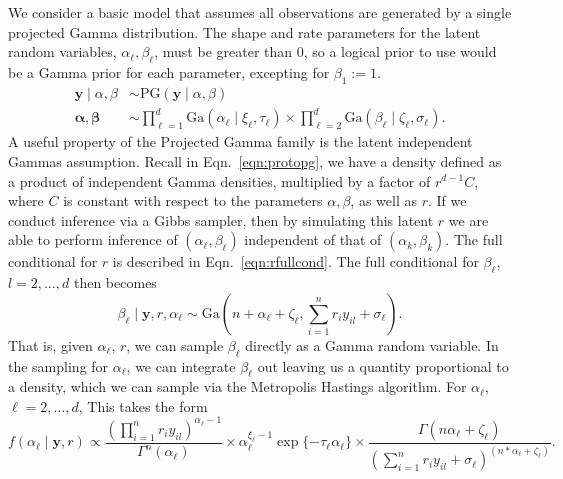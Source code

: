 We consider a basic model that assumes all observations are generated by a single projected Gamma
  distribution.  The shape and rate parameters for the latent  random variables,
  $\alpha_{\ell},\beta_{\ell}$, must be greater than 0, so a logical prior to use would be a Gamma prior for
  each parameter, excepting for $\beta_1 := 1$.
  \begin{equation}
    \label{eqn:vanillap}
    \begin{aligned}
      \bm{ y}\mid\alpha,\beta &\sim \text{PG}(\bm{ y}\mid\alpha,\beta)\\
      \bm{ \alpha},\bm{\beta} &\sim {\textstyle \prod}_{\ell = 1}^d \text{Ga}(\alpha_{\ell} \mid \xi_{\ell},\tau_{\ell})
              \times {\textstyle \prod}_{\ell = 2}^d \text{Ga}(\beta_{\ell}\mid \zeta_{\ell},\sigma_{\ell}).
    \end{aligned}
  \end{equation}
  A useful property of the Projected Gamma family is the latent independent Gammas assumption.  Recall
  in Eqn.~\ref{eqn:protopg}, we have a density defined as a product of independent Gamma densities,
  multiplied by a factor of $r^{d-1}C$, where $C$ is constant with respect to the parameters
  $\alpha,\beta$, as well as $r$.  If we conduct inference via a Gibbs sampler, then by simulating
  this latent $r$ we are able to perform inference of $(\alpha_{\ell},\beta_{\ell})$ independent of
  that of $(\alpha_k,\beta_k)$.  The full conditional for $r$ is described in Eqn.~\ref{eqn:rfullcond}.
  The full conditional for $\beta_{\ell}$, $l = 2,\ldots,d$ then becomes
  \begin{equation}
    \label{eqn:betafc}
    \beta_{\ell}\mid \bm{ y}, r, \alpha_{\ell} \sim \text{Ga}\left(n + \alpha_{\ell} + \zeta_{\ell},
                                      {\textstyle \sum}_{i = 1}^nr_iy_{il} + \sigma_{\ell}\right).
  \end{equation}
  That is, given $\alpha_{\ell}$, $r$, we can sample $\beta_{\ell}$ directly as a Gamma random
  variable.  In the sampling for $\alpha_{\ell}$, we can integrate $\beta_{\ell}$ out leaving us a
  quantity proportional to a density, which we can sample via the Metropolis Hastings
  algorithm\citep{hastings1970}.  For $\alpha_{\ell}$, $\ell = 2,\ldots, d$, This takes the form
  \begin{equation}
    \label{eqn:alphafc}
    f(\alpha_{\ell} \mid \bm{ y}, r) \propto
    \frac{\left({\textstyle \prod}_{i = 1}^nr_iy_{il}\right)^{\alpha_{\ell} - 1}}{\Gamma^n(\alpha_{\ell})} \times
    \alpha_{\ell}^{\xi_{\ell} - 1}\exp\{-\tau_{\ell}\alpha_{\ell}\} \times
    \frac{\Gamma(n\alpha_{\ell} + \zeta_{\ell})}{
        \left({\textstyle\sum}_{i = 1}^n r_iy_{il} + \sigma_{\ell}\right)^{(n * \alpha_{\ell} + \zeta_{\ell})}}.
  \end{equation}
